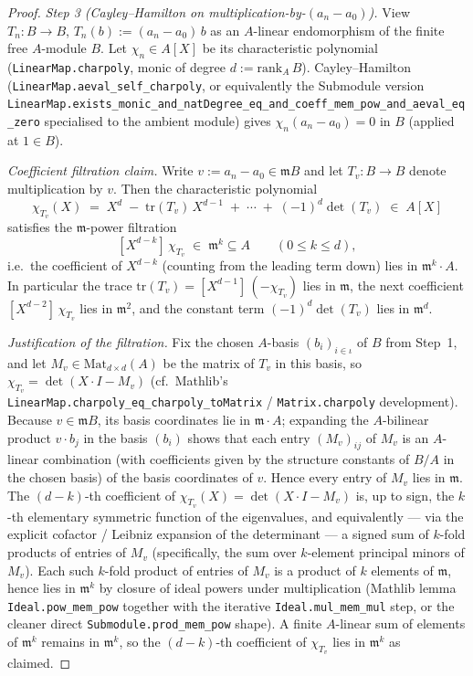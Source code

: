 \begin{proof}
\emph{Step 3 (Cayley--Hamilton on multiplication-by-$(a_n - a_0)$).}
View $T_n : B \to B$, $T_n(b) := (a_n - a_0)\,b$ as an $A$-linear
endomorphism of the finite free $A$-module $B$. Let $\chi_n \in A[X]$
be its characteristic polynomial (\texttt{LinearMap.charpoly}, monic
of degree $d := \mathrm{rank}_A\,B$). Cayley--Hamilton
(\texttt{LinearMap.aeval\_self\_charpoly}, or equivalently the
Submodule version
\texttt{LinearMap.exists\_monic\_and\_natDegree\_eq\_and\_coeff\_mem\_pow\_and\_aeval\_eq\_zero}
specialised to the ambient module) gives $\chi_n(a_n - a_0) = 0$ in
$B$ (applied at $1 \in B$).

\emph{Coefficient filtration claim.} Write $v := a_n - a_0 \in
\mathfrak m B$ and let $T_v : B \to B$ denote multiplication by $v$.
Then the characteristic polynomial
\[
  \chi_{T_v}(X) \;=\; X^d \;-\; \mathrm{tr}(T_v)\,X^{d-1} \;+\; \cdots \;+\;
  (-1)^d \det(T_v) \;\in\; A[X]
\]
satisfies the $\mathfrak m$-power filtration
\[
  [X^{d-k}]\,\chi_{T_v} \;\in\; \mathfrak m^k \subseteq A
  \qquad (0 \le k \le d),
\]
i.e.\ the coefficient of $X^{d-k}$ (counting from the leading term
down) lies in $\mathfrak m^k \cdot A$. In particular the trace
$\mathrm{tr}(T_v) = [X^{d-1}]\,(-\chi_{T_v})$ lies in $\mathfrak m$,
the next coefficient $[X^{d-2}]\,\chi_{T_v}$ lies in $\mathfrak m^2$,
and the constant term $(-1)^d \det(T_v)$ lies in $\mathfrak m^d$.

\emph{Justification of the filtration.} Fix the chosen $A$-basis
$(b_i)_{i \in \iota}$ of $B$ from Step~1, and let $M_v \in
\mathrm{Mat}_{d \times d}(A)$ be the matrix of $T_v$ in this basis,
so $\chi_{T_v} = \det(X \cdot I - M_v)$ (cf.\ Mathlib's
\texttt{LinearMap.charpoly\_eq\_charpoly\_toMatrix} /
\texttt{Matrix.charpoly} development). Because $v \in \mathfrak m B$,
its basis coordinates lie in $\mathfrak m \cdot A$; expanding the
$A$-bilinear product $v \cdot b_j$ in the basis $(b_i)$ shows that
each entry $(M_v)_{ij}$ of $M_v$ is an $A$-linear combination (with
coefficients given by the structure constants of $B/A$ in the chosen
basis) of the basis coordinates of $v$. Hence every entry of $M_v$
lies in $\mathfrak m$. The $(d - k)$-th coefficient of $\chi_{T_v}(X)
= \det(X \cdot I - M_v)$ is, up to sign, the $k$-th elementary
symmetric function of the eigenvalues, and equivalently — via the
explicit cofactor / Leibniz expansion of the determinant — a signed
sum of $k$-fold products of entries of $M_v$ (specifically, the sum
over $k$-element principal minors of $M_v$). Each such $k$-fold
product of entries of $M_v$ is a product of $k$ elements of
$\mathfrak m$, hence lies in $\mathfrak m^k$ by closure of ideal
powers under multiplication (Mathlib lemma
\texttt{Ideal.pow\_mem\_pow} together with the iterative
\texttt{Ideal.mul\_mem\_mul} step, or the cleaner direct
\texttt{Submodule.prod\_mem\_pow} shape). A finite $A$-linear sum of
elements of $\mathfrak m^k$ remains in $\mathfrak m^k$, so the
$(d-k)$-th coefficient of $\chi_{T_v}$ lies in $\mathfrak m^k$ as
claimed.


\end{proof}
